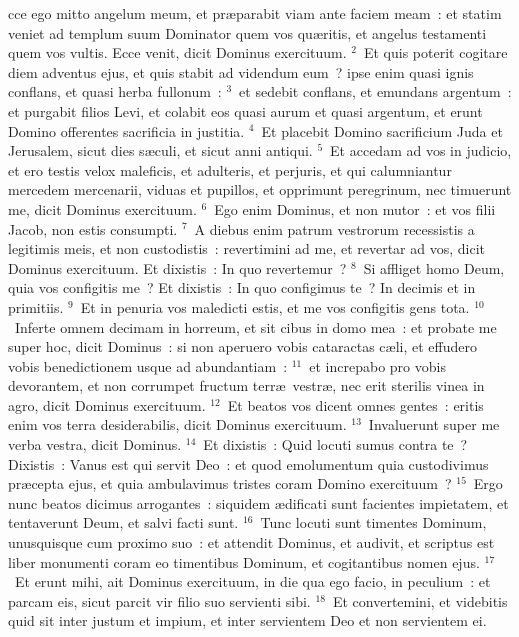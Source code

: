 \bchapter
{}cce ego mitto angelum meum, et pr\ae parabit viam ante faciem meam~: et statim veniet ad templum suum Dominator quem vos qu\ae ritis, et angelus testamenti quem vos vultis. Ecce venit, dicit Dominus exercituum.
${}^{2}$~Et quis poterit cogitare diem adventus ejus, et quis stabit ad videndum eum~? ipse enim quasi ignis conflans, et quasi herba fullonum~:
${}^{3}$~et sedebit conflans, et emundans argentum~: et purgabit filios Levi, et colabit eos quasi aurum et quasi argentum, et erunt Domino offerentes sacrificia in justitia.
${}^{4}$~Et placebit Domino sacrificium Juda et Jerusalem, sicut dies s\ae culi, et sicut anni antiqui.
${}^{5}$~Et accedam ad vos in judicio, et ero testis velox maleficis, et adulteris, et perjuris, et qui calumniantur mercedem mercenarii, viduas et pupillos, et opprimunt peregrinum, nec timuerunt me, dicit Dominus exercituum.
${}^{6}$~Ego enim Dominus, et non mutor~: et vos filii Jacob, non estis consumpti.
${}^{7}$~A diebus enim patrum vestrorum recessistis a legitimis meis, et non custodistis~: revertimini ad me, et revertar ad vos, dicit Dominus exercituum. Et dixistis~: In quo revertemur~?
${}^{8}$~Si affliget homo Deum, quia vos configitis me~? Et dixistis~: In quo configimus te~? In decimis et in primitiis.
${}^{9}$~Et in penuria vos maledicti estis, et me vos configitis gens tota.
${}^{10}$~Inferte omnem decimam in horreum, et sit cibus in domo mea~: et probate me super hoc, dicit Dominus~: si non aperuero vobis cataractas c\ae li, et effudero vobis benedictionem usque ad abundantiam~:
${}^{11}$~et increpabo pro vobis devorantem, et non corrumpet fructum terr\ae\ vestr\ae , nec erit sterilis vinea in agro, dicit Dominus exercituum.
${}^{12}$~Et beatos vos dicent omnes gentes~: eritis enim vos terra desiderabilis, dicit Dominus exercituum.
${}^{13}$~Invaluerunt super me verba vestra, dicit Dominus.
${}^{14}$~Et dixistis~: Quid locuti sumus contra te~? Dixistis~: Vanus est qui servit Deo~: et quod emolumentum quia custodivimus pr\ae cepta ejus, et quia ambulavimus tristes coram Domino exercituum~?
${}^{15}$~Ergo nunc beatos dicimus arrogantes~: siquidem \ae dificati sunt facientes impietatem, et tentaverunt Deum, et salvi facti sunt.
${}^{16}$~Tunc locuti sunt timentes Dominum, unusquisque cum proximo suo~: et attendit Dominus, et audivit, et scriptus est liber monumenti coram eo timentibus Dominum, et cogitantibus nomen ejus.
${}^{17}$~Et erunt mihi, ait Dominus exercituum, in die qua ego facio, in peculium~: et parcam eis, sicut parcit vir filio suo servienti sibi.
${}^{18}$~Et convertemini, et videbitis quid sit inter justum et impium, et inter servientem Deo et non servientem ei.

